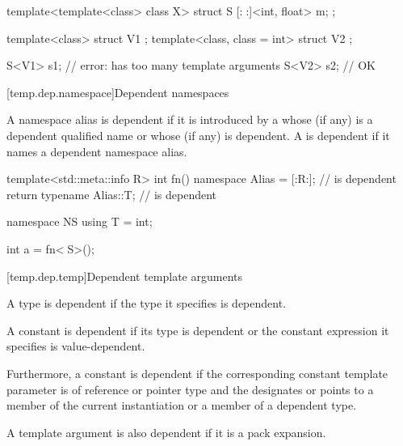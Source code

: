 \pnum
\begin{example}
\begin{codeblock}
template<template<class> class X>
struct S {
  [:^^X:]<int, float> m;
};

template<class> struct V1 {};
template<class, class = int> struct V2 {};

S<V1> s1;                       // error:  has too many template arguments
S<V2> s2;                       // OK
\end{codeblock}
\end{example}

[temp.dep.namespace]{Dependent namespaces}

\pnum
A namespace alias is dependent
if it is introduced by a 
whose  (if any) is
a dependent qualified name or
whose  (if any) is dependent.
A  is dependent
if it names a dependent namespace alias.

\pnum
\begin{example}
\begin{codeblock}
template<std::meta::info R>
int fn() {
  namespace Alias = [:R:];          // \tcode{[:R:]} is dependent
  return typename Alias::T{};       //  is dependent
}

namespace NS {
  using T = int;
}

int a = fn<^^NS>();
\end{codeblock}
\end{example}

[temp.dep.temp]{Dependent template arguments}

\pnum
A type
is dependent if the type it specifies is dependent.

\pnum
A constant
is dependent if its type is dependent or the constant
expression it specifies is value-dependent.

\pnum
Furthermore, a constant
is dependent if the corresponding constant template parameter
is of reference or pointer type and the 
designates or points to a member of the current instantiation or a member of
a dependent type.

\pnum
A template argument is also dependent if it is a pack expansion.

